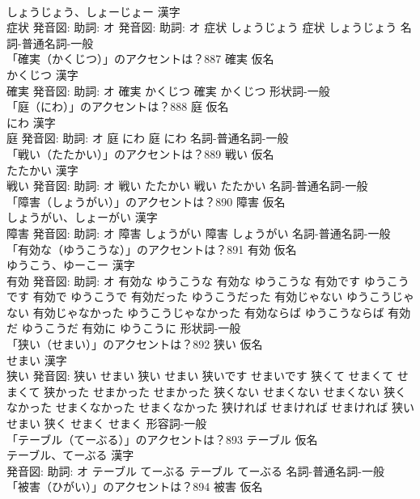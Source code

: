 \documentclass[8pt]{extreport}
\begin{document}
\begin{CJK}{UTF8}{min}
\\	しょうじょう、しょーじょー 漢字　
\\	症状 発音図: 助詞: オ 発音図: 助詞: オ	症状 しょうじょう		症状 しょうじょう				名詞-普通名詞-一般 
\\	「確実（かくじつ）」のアクセントは？887	確実 仮名　
\\	かくじつ 漢字　
\\	確実 発音図: 助詞: オ	確実 かくじつ		確実 かくじつ				形状詞-一般 
\\	「庭（にわ）」のアクセントは？888	庭 仮名　
\\	にわ 漢字　
\\	庭 発音図: 助詞: オ	庭 にわ		庭 にわ				名詞-普通名詞-一般 
\\	「戦い（たたかい）」のアクセントは？889	戦い 仮名　
\\	たたかい 漢字　
\\	戦い 発音図: 助詞: オ	戦い たたかい		戦い たたかい				名詞-普通名詞-一般 
\\	「障害（しょうがい）」のアクセントは？890	障害 仮名　
\\	しょうがい、しょーがい 漢字　
\\	障害 発音図: 助詞: オ	障害 しょうがい		障害 しょうがい				名詞-普通名詞-一般 
\\	「有効な（ゆうこうな）」のアクセントは？891	有効 仮名　
\\	ゆうこう、ゆーこー 漢字　
\\	有効 発音図: 助詞: オ	有効な ゆうこうな		有効な ゆうこうな 有効です ゆうこうです 有効で ゆうこうで 有効だった ゆうこうだった 有効じゃない ゆうこうじゃない 有効じゃなかった ゆうこうじゃなかった 有効ならば ゆうこうならば 有効だ ゆうこうだ 有効に ゆうこうに				形状詞-一般 
\\	「狭い（せまい）」のアクセントは？892	狭い 仮名　
\\	せまい 漢字　
\\	狭い 発音図:	狭い せまい		狭い せまい 狭いです せまいです 狭くて せまくて せまくて 狭かった せまかった せまかった 狭くない せまくない せまくない 狭くなかった せまくなかった せまくなかった 狭ければ せまければ せまければ 狭い せまい 狭く せまく せまく				形容詞-一般 
\\	「テーブル（てーぶる）」のアクセントは？893	テーブル 仮名　
\\	テーブル、てーぶる 漢字　
\\	発音図: 助詞: オ	テーブル てーぶる		テーブル てーぶる				名詞-普通名詞-一般 
\\	「被害（ひがい）」のアクセントは？894	被害 仮名　

\end{CJK}
\end{document}
